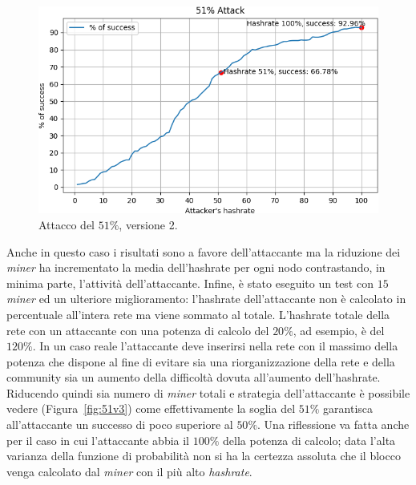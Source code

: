 \begin{figure}[H]
    \centering
    \includegraphics[width=\textwidth]{./images/51-v2.png}
    \caption{Attacco del $51\%$, versione 2.}
    \label{fig:51v2}
\end{figure}
Anche in questo caso i risultati sono a favore dell'attaccante ma la riduzione dei \textit{miner} ha incrementato la media dell'hashrate per ogni nodo contrastando, in minima parte, l'attività dell'attaccante.\newline
Infine, è stato eseguito un test con $15$ \textit{miner} ed un ulteriore miglioramento: l'hashrate dell'attaccante non è calcolato in percentuale all'intera rete ma viene sommato al totale. L'hashrate totale della rete con un attaccante con una potenza di calcolo del $20\%$, ad esempio, è del $120\%$. In un caso reale l'attaccante deve inserirsi nella rete con il massimo della potenza che dispone al fine di evitare sia una riorganizzazione della rete e della community sia un aumento della difficoltà dovuta all'aumento dell'hashrate.\newline
Riducendo quindi sia numero di \textit{miner} totali e strategia dell'attaccante è possibile vedere (Figura~\ref{fig:51v3}) come effettivamente la soglia del $51\%$ garantisca all'attaccante un successo di poco superiore al $50\%$. Una riflessione va fatta anche per il caso in cui l'attaccante abbia il $100\%$ della potenza di calcolo; data l'alta varianza della funzione di probabilità non si ha la certezza assoluta che il blocco venga calcolato dal \textit{miner} con il più alto \textit{hashrate}.
